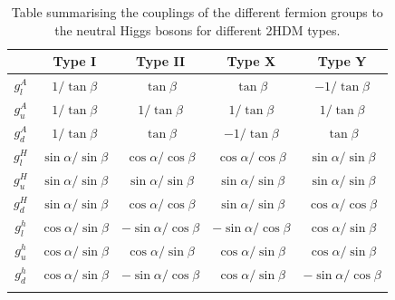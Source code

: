 \begin{table}[h]
\centering
\renewcommand{\arraystretch}{1.5} %
\setlength{\tabcolsep}{12pt} %
\begin{tabular}{|c|c|c|c|c|}
\hline
        & Type I                     & Type II                     & Type X                                        & Type Y                      \\ \hline \hline
$g_l^A$ & $1/\tan{\beta}$            & $\tan{\beta}$               & $\tan{\beta}$    & $-1/\tan{\beta}$            \\ \arrayrulecolor{lightgray} \hline
$g_u^A$ & $1/\tan{\beta}$            & $1/\tan{\beta}$             & $1/\tan{\beta}$                               & $1/\tan{\beta}$             \\ \arrayrulecolor{lightgray} \hline
$g_d^A$ & $1/\tan{\beta}$            & $\tan{\beta}$               & $-1/\tan{\beta}$                              & $\tan{\beta}$               \\ \arrayrulecolor{lightgray} \hline
$g_l^H$ & $\sin{\alpha}/\sin{\beta}$ & $\cos{\alpha}/\cos{\beta}$  & $\cos{\alpha}/\cos{\beta}$                    & $\sin{\alpha}/\sin{\beta}$  \\ \arrayrulecolor{lightgray} \hline
$g_u^H$ & $\sin{\alpha}/\sin{\beta}$ & $\sin{\alpha}/\sin{\beta}$  & $\sin{\alpha}/\sin{\beta}$                    & $\sin{\alpha}/\sin{\beta}$  \\ \arrayrulecolor{lightgray} \hline
$g_d^H$ & $\sin{\alpha}/\sin{\beta}$ & $\cos{\alpha}/\cos{\beta}$  & $\sin{\alpha}/\sin{\beta}$                    & $\cos{\alpha}/\cos{\beta}$  \\ \arrayrulecolor{lightgray} \hline
$g_l^h$ & $\cos{\alpha}/\sin{\beta}$ & $-\sin{\alpha}/\cos{\beta}$ & $-\sin{\alpha}/\cos{\beta}$                   & $\cos{\alpha}/\sin{\beta}$  \\ \arrayrulecolor{lightgray} \hline
$g_u^h$ & $\cos{\alpha}/\sin{\beta}$ & $\cos{\alpha}/\sin{\beta}$  & $\cos{\alpha}/\sin{\beta}$                    & $\cos{\alpha}/\sin{\beta}$  \\ \arrayrulecolor{lightgray} \hline
$g_d^h$ & $\cos{\alpha}/\sin{\beta}$ & $-\sin{\alpha}/\cos{\beta}$ & $\cos{\alpha}/\sin{\beta}$                    & $-\sin{\alpha}/\cos{\beta}$ \\ \arrayrulecolor{black} \hline
\end{tabular}
\caption{Table summarising the couplings of the different fermion groups to the neutral Higgs bosons for different 2HDM types.}
\label{Table:Chapter2_2HDM-Couplings}
\end{table}

